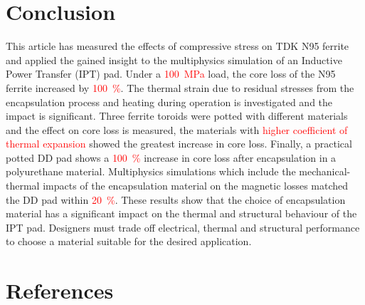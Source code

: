 \documentclass[conference]{IEEEtran}
\begin{document}
\section{Conclusion}

This article has measured the effects of compressive stress on TDK N95 ferrite and applied the gained insight to the multiphysics simulation of an Inductive Power Transfer (IPT) pad. 
Under a \textcolor{red}{\SI{100}{\mega\pascal}} load, the core loss of the N95 ferrite increased by \textcolor{red}{\SI{100}{\percent}}. 
The thermal strain due to residual stresses from the encapsulation process and heating during operation is investigated and the impact is significant. 
Three ferrite toroids were potted with different materials and the effect on core loss is measured, the materials with \textcolor{red}{higher coefficient of thermal expansion} showed the greatest increase in core loss. 
Finally, a practical potted DD pad shows a \textcolor{red}{\SI{100}{\percent}} increase in core loss after encapsulation in a polyurethane material. 
Multiphysics simulations which include the mechanical-thermal impacts of the encapsulation material on the magnetic losses matched the DD pad within \textcolor{red}{\SI{20}{\percent}}. 
These results show that the choice of encapsulation material has a significant impact on the thermal and structural behaviour of the IPT pad. 
Designers must trade off electrical, thermal and structural performance to choose a material suitable for the desired application.

\section*{References}
\printbibliography[heading=none]
\end{document}
